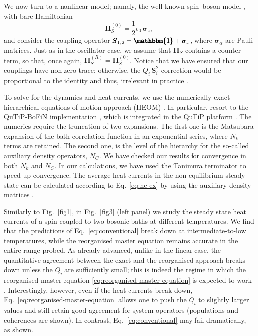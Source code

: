 \documentclass[aps,pra,superscriptaddress,twocolumn,nofootinbib]{revtex4-2}
\begin{document}
We now turn to a nonlinear model; namely, the well-known spin--boson model \cite{lambert2019,boudjada2014,yang2014,purkayastha2020,thoss2001,anders2007}, with bare Hamiltonian
\begin{equation}\label{eq:sys-qb}
	\pmb H_S^{(0)} = \frac{1}{2} \epsilon_0\,\pmb \sigma_z,
\end{equation}
and consider the coupling operator
$\pmb S_{1,2} = \pmb{\mathbbm{1}} + \pmb \sigma_x$, where $\pmb\sigma_\alpha$ are Pauli matrices. Just as in the oscillator case, we assume that $ \pmb{H}_S $ contains a counter term, so that, once again, $ \pmb{H}_S^{(R)} = \pmb{H}_S^{(0)} $. Notice that we have ensured that our couplings have non-zero trace; otherwise, the $ Q_i\,\pmb{S}_i^2 $ correction would be proportional to the identity and thus, irrelevant in practice \cite{cresser2021,timofeev2022,cerisola2022}.

To solve for the dynamics and heat currents, we use the numerically exact hierarchical equations of motion approach (HEOM) \cite{tanimura1989, tanimura2020}. In particular, resort to the QuTiP-BoFiN implementation \cite{lambert2023},  which is integrated in the QuTiP platform \cite{johansson2012, johansson2013}. The numerics require the truncation of two expansions. The first one is the Matsubara expansion of the bath correlation function in an exponential series, where $N_k$ terms are retained. The second one, is the level of the hierarchy for the so-called auxiliary density operators, $N_C$. We have checked our results for convergence in both $N_k$ and $N_C$. In our calculations, we have used the Tanimura terminator \cite{lambert2023} to speed up convergence. The average heat currents in the non-equilibrium steady state can be calculated according to Eq.~\eqref{eq:hc-ex} by using the auxiliary density matrices \cite{tanimura2020}.   

Similarly to Fig.~\ref{fig1}, in Fig.~\ref{fig3} (left panel) we study the steady state heat currents of a spin coupled to two bosonic baths at different temperatures. We find that the predictions of Eq.~\eqref{eq:conventional} break down at intermediate-to-low temperatures, while the reorganised master equation remains accurate in the entire range probed. As already advanced, unlike in the linear case, the quantitative agreement between the exact and the reorganised approach breaks down unless the $ Q_i $ are sufficiently small; this is indeed the regime in which the reorganised master equation \eqref{eq:reorganised-master-equation} is expected to work \cite{correa2023}. Interestingly, however, even if the heat currents break down, Eq.~\eqref{eq:reorganised-master-equation} allows one to push the $ Q_i $ to slightly larger values and still retain good agreement for system operators (populations and coherences are shown). In contrast, Eq.~\eqref{eq:conventional} may fail dramatically, as shown.
\end{document}
